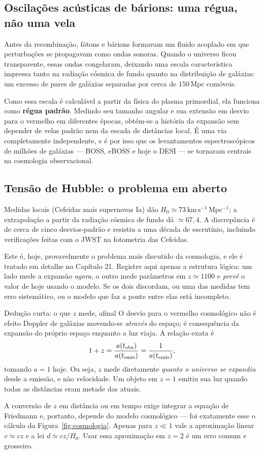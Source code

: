 \documentclass[11pt,a4paper]{article}
\begin{document}
\subsection*{Oscilações acústicas de bárions: uma régua, não uma vela}

Antes da recombinação, fótons e bárions formavam um fluido acoplado em que perturbações se propagavam como ondas sonoras. Quando o universo ficou transparente, essas ondas congelaram, deixando uma escala característica impressa tanto na radiação cósmica de fundo quanto na distribuição de galáxias: um excesso de pares de galáxias separadas por cerca de $150\,\mathrm{Mpc}$ comóveis.

Como essa escala é calculável a partir da física do plasma primordial, ela funciona como \textbf{régua padrão}. Medindo seu tamanho angular e sua extensão em desvio para o vermelho em diferentes épocas, obtém-se a história da expansão sem depender de velas padrão nem da escada de distâncias local. É uma via completamente independente, e é por isso que os levantamentos espectroscópicos de milhões de galáxias --- BOSS, eBOSS e hoje o DESI --- se tornaram centrais na cosmologia observacional.

\subsection*{Tensão de Hubble: o problema em aberto}

Medidas locais (Cefeidas mais supernovas Ia) dão $H_0\simeq73\,\mathrm{km\,s^{-1}\,Mpc^{-1}}$; a extrapolação a partir da radiação cósmica de fundo dá $\simeq67{,}4$. A discrepância é de cerca de cinco desvios-padrão e resistiu a uma década de escrutínio, incluindo verificações feitas com o JWST na fotometria das Cefeidas.

Este é, hoje, provavelmente o problema mais discutido da cosmologia, e ele é tratado em detalhe no Capítulo 21. Registre aqui apenas a estrutura lógica: um lado mede a expansão \emph{agora}, o outro mede parâmetros em $z\simeq1100$ e \emph{prevê} o valor de hoje usando o modelo. Se os dois discordam, ou uma das medidas tem erro sistemático, ou o modelo que faz a ponte entre elas está incompleto.

\begin{lessonblock}[borderline west={2pt}{0pt}{astroGold}]{Dedução curta: o que $z$ mede, afinal}
O desvio para o vermelho cosmológico não é efeito Doppler de galáxias movendo-se \emph{através} do espaço; é consequência da expansão do próprio espaço enquanto a luz viaja. A relação exata é
\[
1+z=\frac{a(t_{\rm obs})}{a(t_{\rm emis})}=\frac{1}{a(t_{\rm emis})},
\]
tomando $a=1$ hoje. Ou seja, $z$ mede diretamente \emph{quanto o universo se expandiu} desde a emissão, e não velocidade. Um objeto em $z=1$ emitiu sua luz quando todas as distâncias eram metade das atuais.

A conversão de $z$ em distância ou em tempo exige integrar a equação de Friedmann e, portanto, depende do modelo cosmológico --- foi exatamente esse o cálculo da Figura~\ref{fig:cosmologia}. Apenas para $z\ll1$ vale a aproximação linear $v\simeq cz$ e a lei $d\simeq cz/H_0$. Usar essa aproximação em $z=2$ é um erro comum e grosseiro.
\end{lessonblock}
\end{document}
